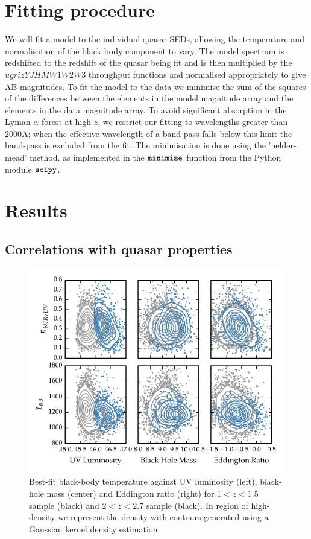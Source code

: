\section{Fitting procedure}

We will fit a model to the individual quasar SEDs, allowing the temperature and normalisation of the black body component to vary. 
The model spectrum is redshifted to the redshift of the quasar being fit and is then multiplied by the $ugrizYJHMW1W2W3$ throughput functions and normalised appropriately to give AB magnitudes. 
To fit the model to the data we minimise the sum of the squares of the differences between the elements in the model magnitude array and the elements in the data magnitude array. 
To avoid significant absorption in the Lyman-$\alpha$ forest at high-$z$, we restrict our fitting to wavelengths greater than 2000A; when the effective wavelength of a band-pass falls below this limit the band-pass is excluded from the fit. 
The minimisation is done using the 'nelder-mead' method, as implemented in the ${\tt minimize}$ function from the Python module ${\tt scipy}$. 

\section{Results}

\subsection{Correlations with quasar properties}

\begin{figure}
  \centering
  \includegraphics[width=\textwidth]{figures/chapter06/correlations_contour.pdf}
  \caption{Best-fit black-body temperature against UV luminosity (left), black-hole mass (center) and Eddington ratio (right) for $1 < z < 1.5$ sample (black) and $2 < z < 2.7$ sample (black). In region of high-density we represent the density with contours generated using a Gaussian kernel density estimation.}
  \label{fig:}
\end{figure}

